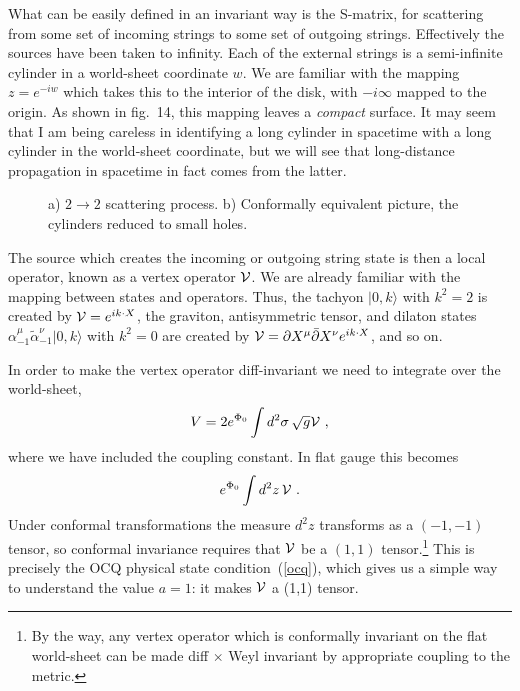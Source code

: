What can be easily defined in an invariant way is the S-matrix, for
scattering from some set of incoming strings to some set of
outgoing strings.  Effectively the sources have been taken to
infinity.  Each of the external strings is a semi-infinite cylinder
in a world-sheet coordinate $w$.  We are
familiar with the mapping $z = e^{-i w}$ which takes this to the interior
of the disk, with $-i\infty$ mapped to the origin. 
As shown in fig.~14, this mapping leaves a {\it compact}
surface.  It may seem that I am being careless in identifying
a long cylinder in spacetime with a long cylinder in the world-sheet
coordinate, but we will see that
long-distance propagation in spacetime
in fact comes from the latter.
\begin{figure}
\begin{center}
\leavevmode
{}
\end{center}
\caption[]{a) $2 \to 2$ scattering process.  b) Conformally equivalent
picture, the cylinders reduced to small holes.}
\end{figure}
The source which creates the
incoming or outgoing string state is then a local operator,
known as a vertex operator ${\cal V}$.  We
are already familiar with the mapping between states and operators.
Thus, the tachyon $|0,k\rangle$ with $k^2 = 2$ is created by
${\cal V} = e^{i k \cdot X}$, the graviton, antisymmetric tensor, and
dilaton states $ \alpha_{-1}^\mu \tilde \alpha_{-1}^\nu |0,k\rangle$
with $k^2 = 0$ are created by ${\cal V} = \partial X^\mu \bar\partial
X^\nu e^{ik \cdot X}$, and so on.

In order to make the vertex operator diff-invariant we need to
integrate over the world-sheet,
\begin{equation}
V = 2 e^{\Phi_0}\int d^2 \sigma \,\sqrt{g} {\cal V}\ ,
\end{equation}
where we have included the coupling constant.
In flat gauge this becomes
\begin{equation}
 e^{\Phi_0} \int d^2z\, {\cal V}\ .
\end{equation}
Under conformal transformations the measure $d^2z$ transforms as a
$(-1,-1)$ tensor, so conformal invariance requires that ${\cal V}$
be a $(1,1)$ tensor.\footnote
{By the way, any vertex operator which is conformally invariant on
the flat world-sheet can be made diff $\times $ Weyl invariant by
appropriate coupling to the metric.}
This is precisely the OCQ physical
state condition~(\ref{ocq}), which gives us a simple way to
understand the value $a = 1$: it makes ${\cal V}$ a
(1,1) tensor.

